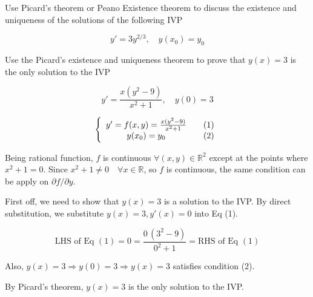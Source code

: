 \begin{example}
    Use Picard's theorem or Peano Existence theorem to discuss the existence and 
    uniqueness of the solutions of the following IVP

    \[
        y' = 3y^{2/3}, \quad y(x_0) = y_0
    \]
\end{example}

\begin{example}
    Use the Picard's existence and uniqueness theorem to prove that $y(x) = 3$ is the only 
    solution to the IVP

    \[
        y' = \frac{x(y^2 - 9)}{x^2 + 1}, \quad y(0) = 3
    \]
\end{example}

\begin{solution}
    \[
\left\{
\begin{array}{cc}
 y' = f(x,y) = \frac{x(y^2 - 9)}{x^2 + 1} & \quad \refstepcounter{equation}(1)\\
 y(x_0) = y_0 & \quad \refstepcounter{equation}(2)
\end{array}
\right.
\]

Being rational function, $f$ is continuous $\forall (x, y) \in \mathbb{R}^2$ except at the points 
where $x^2 + 1 = 0$. Since $x^2 + 1 \neq 0 \quad \forall x \in \mathbb{R}$, so $f$ is 
continuous, the same condition can be apply on $\partial f / \partial y$.

First off, we need to show that  $y(x) = 3$ is a solution to the IVP. 
By direct substitution, we substitute $y(x) = 3, y'(x) = 0$ into Eq (1).

\[
    \text{LHS of Eq } (1) = 0 = \frac{0\,(3^2 - 9)}{0^2 + 1} = \text{RHS of Eq }(1)
\]

Also, $y(x) = 3 \Rightarrow y(0) = 3 \Rightarrow y(x) = 3$ satisfies condition (2).

By Picard's theorem, $y(x) = 3$ is the only solution to the IVP.


\end{solution}